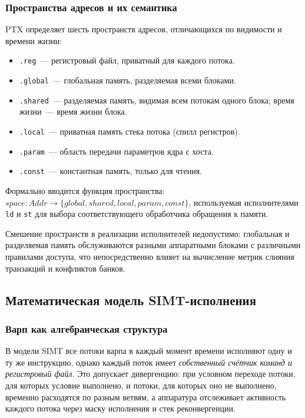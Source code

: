 \subsubsection{Пространства адресов и их семантика}

PTX определяет шесть пространств адресов, отличающихся по видимости
и времени жизни:

\begin{itemize}
  \item \texttt{.reg}~--- регистровый файл, приватный для каждого потока.
  \item \texttt{.global}~--- глобальная память, разделяемая всеми блоками.
  \item \texttt{.shared}~--- разделяемая память, видимая всем потокам
        одного блока; время жизни~--- время жизни блока.
  \item \texttt{.local}~--- приватная память стека потока (спилл регистров).
  \item \texttt{.param}~--- область передачи параметров ядра с хоста.
  \item \texttt{.const}~--- константная память, только для чтения.
\end{itemize}

Формально вводится функция пространства:
$\mathit{space} : \mathit{Addr} \to \{\mathit{global}, \mathit{shared},
\mathit{local}, \mathit{param}, \mathit{const}\}$,
используемая исполнителями \texttt{ld} и \texttt{st} для выбора
соответствующего обработчика обращения к памяти.

Смешение пространств в реализации исполнителей недопустимо:
глобальная и разделяемая память обслуживаются разными аппаратными блоками
с различными правилами доступа, что непосредственно влияет на вычисление
метрик слияния транзакций и конфликтов банков.

\newpage
\subsection{Математическая модель SIMT-исполнения}

\subsubsection{Варп как алгебраическая структура}

В модели SIMT все потоки варпа в каждый момент времени исполняют
одну и ту же инструкцию, однако каждый поток имеет \emph{собственный
счётчик команд и регистровый файл}. Это допускает дивергенцию:
при условном переходе потоки, для которых условие выполнено, и потоки,
для которых оно не выполнено, временно расходятся по разным ветвям,
а аппаратура отслеживает активность каждого потока через маску исполнения
и стек реконвергенции.

